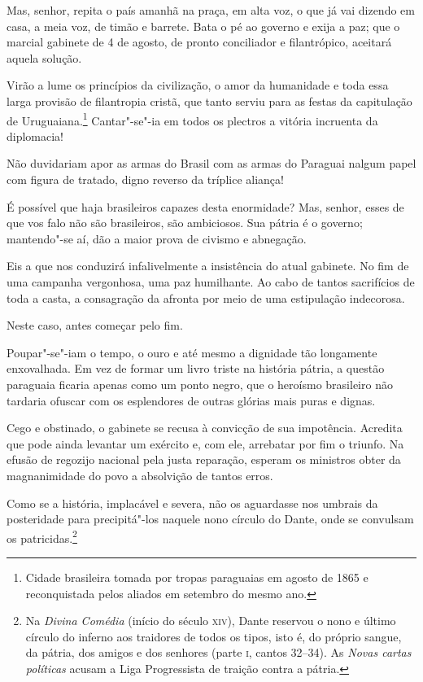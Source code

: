  Mas, senhor, repita o país amanhã na praça, em alta voz, o que já vai
dizendo em casa, a meia voz, de timão e barrete. Bata o pé ao governo e
exija a paz; que o marcial gabinete de 4 de agosto, de pronto
conciliador e filantrópico, aceitará aquela solução. 

 Virão a lume os princípios da civilização, o amor da humanidade e toda
essa larga provisão de filantropia cristã, que tanto serviu para as
festas da capitulação de
Uruguaiana.\footnote{ Cidade brasileira tomada por tropas paraguaias em agosto de 1865 e
reconquistada pelos aliados em setembro do mesmo ano.}
 Cantar"-se"-ia em todos os plectros a vitória incruenta da diplomacia!

 Não duvidariam apor as armas do Brasil com as armas do Paraguai nalgum
papel com figura de tratado, digno reverso da tríplice aliança!

  É possível que haja brasileiros capazes desta enormidade? Mas, senhor,
esses de que vos falo não são brasileiros, são ambiciosos. Sua pátria é
o governo; mantendo"-se aí, dão a maior prova de civismo e abnegação. 

 Eis a que nos conduzirá infalivelmente a insistência do atual gabinete.
No fim de uma campanha vergonhosa, uma paz humilhante. Ao cabo de
tantos sacrifícios de toda a casta, a consagração da afronta por meio
de uma estipulação indecorosa. 

 Neste caso, antes começar pelo fim.

 Poupar"-se"-iam o tempo, o ouro e até mesmo a dignidade tão
longamente enxovalhada. Em vez de formar um livro triste na história
pátria, a questão paraguaia ficaria apenas como um ponto negro, que o
heroísmo brasileiro não tardaria ofuscar com os esplendores de outras
glórias mais puras e dignas.

 Cego e obstinado, o gabinete se recusa à convicção de sua impotência.
Acredita que pode ainda levantar um exército e, com ele, arrebatar por
fim o triunfo. Na efusão de regozijo nacional pela justa reparação,
esperam os ministros obter da magnanimidade do povo a absolvição de
tantos erros.

 Como se a história, implacável e severa, não os aguardasse nos umbrais
da posteridade para precipitá"-los naquele nono círculo do Dante, onde
se convulsam os
patricidas.\footnote{ Na \textit{Divina Comédia} (início do século \textsc{xiv}), Dante reservou o nono e
último círculo do inferno aos traidores de todos os tipos, isto é, do
próprio sangue, da pátria, dos amigos e dos senhores (parte \textsc{i}, cantos
32--34). As \textit{Novas cartas políticas} acusam a Liga Progressista
de traição contra a pátria.}
 
